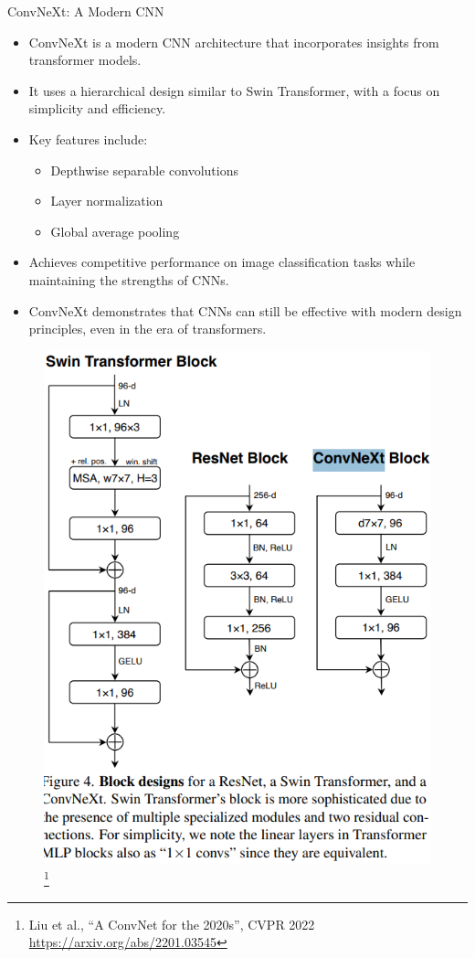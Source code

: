 \begin{frame}[allowframebreaks]{ConvNeXt: A Modern CNN}
    \begin{itemize}
        \item ConvNeXt is a modern CNN architecture that incorporates insights from transformer models.
        \item It uses a hierarchical design similar to Swin Transformer, with a focus on simplicity and efficiency.
        \item Key features include:
            \begin{itemize}
                \item Depthwise separable convolutions
                \item Layer normalization
                \item Global average pooling
            \end{itemize}
        \item Achieves competitive performance on image classification tasks while maintaining the strengths of CNNs.
        \item ConvNeXt demonstrates that CNNs can still be effective with modern design principles, even in the era of transformers.
    \end{itemize}
    \framebreak
    \begin{figure}
        \centering
        \includegraphics[width=\linewidth,height=0.9\textheight,keepaspectratio]{images/vit/ConvNeXt.png}
        \footnote{Liu et al., “A ConvNet for the 2020s”, CVPR 2022 \url{https://arxiv.org/abs/2201.03545}}
    \end{figure}
\end{frame}